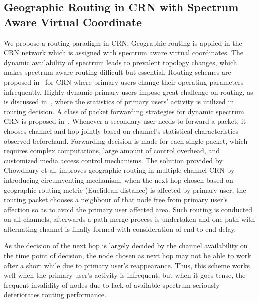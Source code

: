 \subsection{Geographic Routing in CRN with Spectrum Aware Virtual Coordinate}
We propose a routing paradigm in CRN.
Geographic routing is applied in the CRN network which is assigned with spectrum aware virtual coordinates.
The dynamic availability of spectrum leads to prevalent topology changes, which makes spectrum aware routing difficult but essential.
Routing schemes are proposed in~\cite{Abbagnale_Gymkhana10, caodv-10wd, segment-crowncom08} for CRN where primary users change their operating parameters infrequently.
Highly dynamic primary users impose great challenge on routing, as is discussed in~\cite{Routing-crn-INFOCOM11}, where the statistics of primary users' activity is utilized in routing decision.
A class of packet forwarding strategies for dynamic spectrum CRN is proposed in~\cite{routing-crn-icc11, routing-crn-jsac12}.
Whenever a secondary user needs to forward a packet, it chooses channel and hop jointly based on channel's statistical characteristics observed beforehand.
Forwarding decision is made for each single packet, which requires complex computations, large amount of control overhead, and customized media access control mechanisms.
The solution provided by Chowdhury et al.\cite{search_geo_routing_chowdhury} improves geographic routing in multiple channel CRN by introducing circumventing mechanism, \ie when the next hop chosen based on geographic routing metric (\eg Euclidean distance) is affected by primary user, the routing packet chooses a neighbour of that node free from primary user's affection so as to avoid the primary user affected area.
Such routing is conducted on all channels, afterwards a path merge process is undertaken and one path with alternating channel is finally formed with consideration of end to end delay.

As the decision of the next hop is largely decided by the channel availability on the time point of decision, the node chosen as next hop may not be able to work after a short while due to primary user's reappearance.
Thus, this scheme works well when the primary user's activity is infrequent, but when it goes tense, the frequent invalidity of nodes due to lack of available spectrum seriously deteriorates routing performance.

